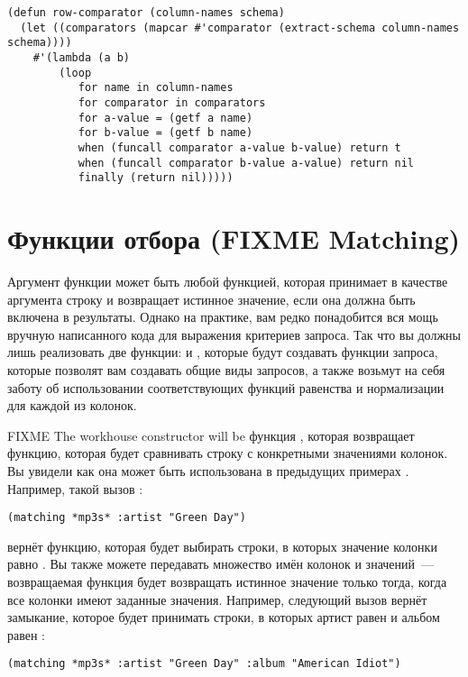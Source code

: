 \begin{lstlisting}
(defun row-comparator (column-names schema)
  (let ((comparators (mapcar #'comparator (extract-schema column-names schema))))
    #'(lambda (a b)
        (loop
           for name in column-names
           for comparator in comparators
           for a-value = (getf a name)
           for b-value = (getf b name)
           when (funcall comparator a-value b-value) return t
           when (funcall comparator b-value a-value) return nil
           finally (return nil)))))
\end{lstlisting}

\section{Функции отбора (FIXME Matching)}

Аргумент  функции  может быть любой функцией, которая принимает
в качестве аргумента строку и возвращает истинное значение, если она должна быть включена
в результаты.  Однако на практике, вам редко понадобится вся мощь вручную написанного кода
для выражения критериев запроса.  Так что вы должны лишь реализовать две функции:
 и , которые будут создавать функции запроса, которые позволят вам
создавать общие виды запросов, а также возьмут на себя заботу об использовании
соответствующих функций равенства и нормализации для каждой из колонок.

FIXME The workhouse  constructor will be функция ,
которая возвращает функцию, которая будет сравнивать строку с конкретными значениями
колонок.  Вы увидели как она может быть использована в предыдущих примерах .
Например, такой вызов :

\begin{lstlisting}
(matching *mp3s* :artist "Green Day")
\end{lstlisting}

вернёт функцию, которая будет выбирать строки, в которых значение колонки 
равно .  Вы также можете передавать множество имён колонок и
значений~--- возвращаемая функция будет возвращать истинное значение только тогда, когда
все колонки имеют заданные значения.  Например, следующий вызов вернёт замыкание, которое
будет принимать строки, в которых артист равен  и альбом равен
:

\begin{lstlisting}
(matching *mp3s* :artist "Green Day" :album "American Idiot")
\end{lstlisting}

